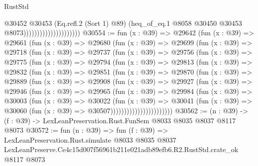\begin{lexlean}{RustStd}
\begin{coremodule}
                                          @30452
                                            @30453
                                            (Eq.refl.{2} (Sort 1) @89)
                                            (heq_of_eq.{1}
                                              @8058
                                              @30450
                                              @30453
                                              @8073)))))))))))))))))))))
@30554 := fun (x : @39) =>
  @29642
    (fun (x : @39) =>
    @29661
      (fun (x : @39) =>
      @29680
        (fun (x : @39) =>
        @29699
          (fun (x : @39) =>
          @29718
            (fun (x : @39) =>
            @29737
              (fun (x : @39) =>
              @29756
                (fun (x : @39) =>
                @29775
                  (fun (x : @39) =>
                  @29794
                    (fun (x : @39) =>
                    @29813
                      (fun (x : @39) =>
                      @29832
                        (fun (x : @39) =>
                        @29851
                          (fun (x : @39) =>
                          @29870
                            (fun (x : @39) =>
                            @29889
                              (fun (x : @39) =>
                              @29908
                                (fun (x : @39) =>
                                @29927
                                  (fun (x : @39) =>
                                  @29946
                                    (fun (x : @39) =>
                                    @29965
                                      (fun (x : @39) =>
                                      @29984
                                        (fun (x : @39) =>
                                        @30003
                                          (fun (x : @39) =>
                                          @30022
                                            (fun (x : @39) =>
                                            @30041
                                              (fun (x : @39) =>
                                              @30060 (fun (x : @39) => @30507)))))))))))))))))))))))
@30562 := (n : @39) -> (f : @39) -> LexLeanPreservation.Rust.FunSem @8033 @8035 @8037 @8117 @8073
@30572 := fun (n : @39) =>
  fun (f : @39) =>
  LexLeanPreservation.Rust.simulate
    @8033
    @8035
    @8037
    LexLeanPreserve.Ce4c15d007f56961b211e021adb89efb6.R2.RustStd.crate_ok
    @8117
    @8073
\end{coremodule}
\end{lexlean}
